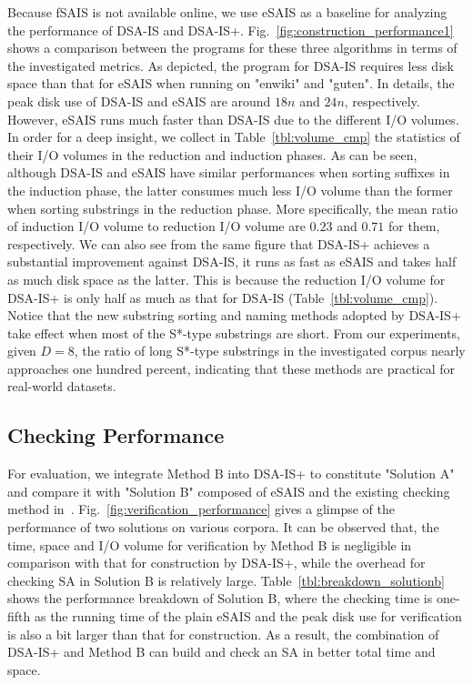 \documentclass[10pt,journal,compsoc]{IEEEtran}
\begin{document}
Because fSAIS is not available online, we use eSAIS as a baseline for analyzing the performance of DSA-IS and DSA-IS+. Fig.~\ref{fig:construction_performance1} shows a comparison between the programs for these three algorithms in terms of the investigated metrics. As depicted, the program for DSA-IS requires less disk space than that for eSAIS when running on "enwiki" and "guten". In details, the peak disk use of DSA-IS and eSAIS are around $18n$ and $24n$, respectively. However, eSAIS runs much faster than DSA-IS due to the different I/O volumes. In order for a deep insight, we collect in Table~\ref{tbl:volume_cmp} the statistics of their I/O volumes in the reduction and induction phases. As can be seen, although DSA-IS and eSAIS have similar performances when sorting suffixes in the induction phase, the latter consumes much less I/O volume than the former when sorting substrings in the reduction phase. More specifically, the mean ratio of induction I/O volume to reduction I/O volume are $0.23$ and $0.71$ for them, respectively. We can also see from the same figure that DSA-IS+ achieves a substantial improvement against DSA-IS, it runs as fast as eSAIS and takes half as much disk space as the latter. This is because the reduction I/O volume for DSA-IS+ is only half as much as that for DSA-IS (Table~\ref{tbl:volume_cmp}). Notice that the new substring sorting and naming methods adopted by DSA-IS+ take effect when most of the S*-type substrings are short. From our experiments, given $D = 8$, the ratio of long S*-type substrings in the investigated corpus nearly approaches one hundred percent, indicating that these methods are practical for real-world datasets.

\subsection{Checking Performance}

For evaluation, we integrate Method B into DSA-IS+ to constitute "Solution A" and compare it with "Solution B" composed of eSAIS and the existing checking method in~\cite{Dementiev2008a}. Fig.~\ref{fig:verification_performance} gives a glimpse of the performance of two solutions on various corpora. It can be observed that, the time, space and I/O volume for verification by Method B is negligible in comparison with that for construction by DSA-IS+, while the overhead for checking SA in Solution B is relatively large. Table~\ref{tbl:breakdown_solutionb} shows the performance breakdown of Solution B, where the checking time is one-fifth as the running time of the plain eSAIS and the peak disk use for verification is also a bit larger than that for construction. As a result, the combination of DSA-IS+ and Method B can build and check an SA in better total time and space.
\end{document}
